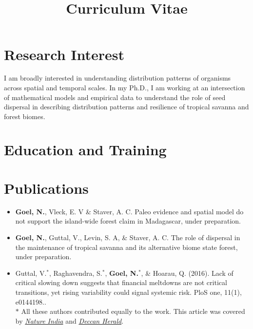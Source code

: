 \documentclass[11pt,a4paper,sans]{moderncv}        %
\title{Curriculum Vitae}                               %
\begin{document}
\makecvtitle

\section{Research Interest}

I am broadly interested in understanding distribution patterns of organisms across spatial and temporal scales. In my Ph.D., I am working at an intersection of mathematical models and empirical data to understand the role of seed dispersal in describing distribution patterns and resilience of tropical savanna and forest biomes.

\section{Education and Training}

\section{Publications}
\begin{itemize}
\item{\textbf{Goel, N.}, Vleck, E. V \& Staver, A. C. Paleo evidence and spatial model do not support the island-wide forest claim in Madagascar, under preparation.}\\
\item{\textbf{Goel, N.}, Guttal, V., Levin, S. A, \& Staver, A. C. The role of dispersal in the maintenance of tropical savanna and its alternative biome state forest, under preparation.}\\
\item{Guttal, V.$^*$, Raghavendra, S.$^*$, \textbf{Goel, N.}$^*$, \& Hoarau, Q. (2016). Lack of critical slowing down suggests that financial meltdowns are not critical transitions, yet rising variability could signal systemic risk. PloS one, 11(1), e0144198..\\{\footnotesize $\ast$ All these authors contributed equally to the work. This article was covered by \href{http://www.natureasia.com/en/nindia/article/10.1038/nindia.2016.4}{\textit{Nature India}} and \href{http://www.deccanherald.com/content/523339/look-natural-disasters-prevent-big.html}{\textit{Deccan Herald}}.}}
\end{itemize}
\end{document}
